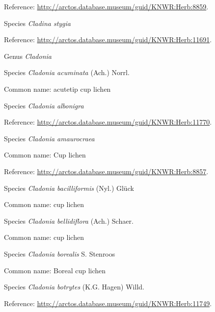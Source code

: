\documentclass[9pt, article]{memoir}
\begin{document}
\begin{multicols}{2}
Reference: 
\url{http://arctos.database.museum/guid/KNWR:Herb:8859}.

\vspace{6pt}\noindent\hspace{36pt}Species \textit{Cladina stygia}


Reference: 
\url{http://arctos.database.museum/guid/KNWR:Herb:11691}.

\vspace{6pt}\noindent\hspace{30pt}Genus \textit{Cladonia}


\vspace{6pt}\noindent\hspace{36pt}Species \textit{Cladonia acuminata} (Ach.) Norrl.


Common name: acutetip cup lichen

\vspace{6pt}\noindent\hspace{36pt}Species \textit{Cladonia albonigra}


Reference: 
\url{http://arctos.database.museum/guid/KNWR:Herb:11770}.

\vspace{6pt}\noindent\hspace{36pt}Species \textit{Cladonia amaurocraea}


Common name: Cup lichen

Reference: 
\url{http://arctos.database.museum/guid/KNWR:Herb:8857}.

\vspace{6pt}\noindent\hspace{36pt}Species \textit{Cladonia bacilliformis} (Nyl.) Glück


Common name: cup lichen

\vspace{6pt}\noindent\hspace{36pt}Species \textit{Cladonia bellidiflora} (Ach.) Schaer.


Common name: cup lichen

\vspace{6pt}\noindent\hspace{36pt}Species \textit{Cladonia borealis} S. Stenroos


Common name: Boreal cup lichen

\vspace{6pt}\noindent\hspace{36pt}Species \textit{Cladonia botrytes} (K.G. Hagen) Willd.


Reference: 
\url{http://arctos.database.museum/guid/KNWR:Herb:11749}.


\end{multicols}
\end{document}
